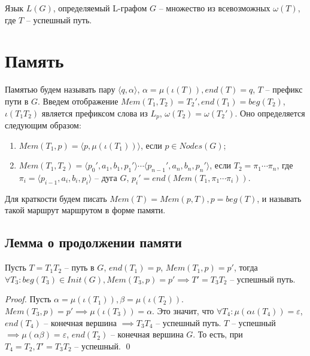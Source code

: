 Язык $L(G)$, определяемый L-графом $G$ -- множество из всевозможных $\omega(T)$, где $T$ -- успешный путь.

\section{Память}
Памятью будем называть пару $\langle q, \alpha \rangle$, $\alpha=\mu(\iota(T)), end(T)=q$, $T$ --  префикс пути в $G$. 
Введем отображение $Mem(T_1,T_2) = T_2', end(T_1) = beg(T_2)$, $\iota(T_1 T_2)$ является префиксом слова из $L_p$, $\omega(T_2) = \omega(T_2')$.
Оно определяется следующим образом:
\begin{enumerate}
    \item $Mem(T_1, p) = \langle p, \mu(\iota(T_1)) \rangle$, если $p \in Nodes(G)$;
    \item {
        $Mem(T_1, T_2) = \langle p_0', a_1, b_1, p_1' \rangle \cdots \langle p_{n-1}', a_n, b_n, p_n' \rangle$, если $T_2 =\pi_1 \cdots \pi_n$, 
        где $\pi_i = \langle p_{i-1}, a_i, b_i, p_i \rangle$ -- дуга $G$, $p_i' = end(Mem(T_1, \pi_1 \cdots \pi_i))$.
    }
\end{enumerate}

Для краткости будем писать $Mem(T) = Mem(p, T), p = beg(T)$, и называть такой маршрут маршрутом в форме памяти. 

\subsection*{Лемма о продолжении памяти}
\begin{lemma}
    \label{mem_continue_lemma}
    Пусть $T=T_1 T_2$ -- путь в $G$, $end(T_1) = p$, $Mem(T_1, p) = p'$, тогда $\forall T_3 : beg(T_3) \in Init(G), Mem(T_3, p) = p' \implies T' = T_3 T_2$ -- успешный путь. 
\end{lemma}
\begin{proof}
    Пусть $\alpha = \mu(\iota(T_1)), \beta = \mu(\iota(T_2))$.
    $Mem(T_3, p) = p' \implies \mu(\iota(T_3)) = \alpha$.
    Это значит, что $\forall T_4 : \mu(\alpha \iota(T_4)) = \varepsilon$, $end(T_4)$ -- конечная вершина  $\implies T_3 T_4$ -- успешный путь.
    $T$ -- успешный $\implies \mu(\alpha \beta) = \varepsilon$, $end(T_2)$ -- конечная вершина $G$. 
    То есть, при $T_4 = T_2, T' = T_3 T_2$ -- успешный. \qed

    
\end{proof}


